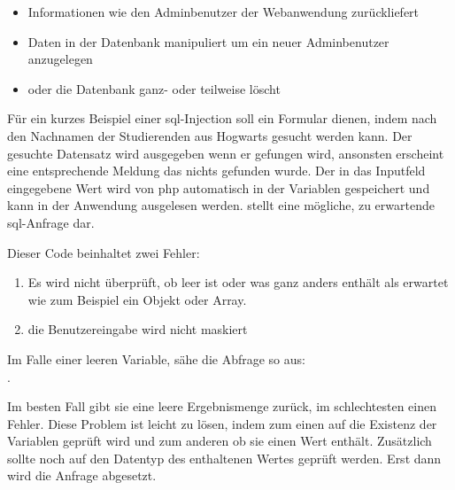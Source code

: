 \begin{itemize}
	\item Informationen wie den Adminbenutzer der Webanwendung zurückliefert
	\item Daten in der Datenbank manipuliert um ein neuer Adminbenutzer anzugelegen
	\item oder die Datenbank ganz- oder teilweise löscht
\end{itemize}

Für ein kurzes Beispiel einer \gls{sql}-Injection soll ein Formular dienen, indem nach den Nachnamen der Studierenden aus Hogwarts gesucht werden kann. Der gesuchte  Datensatz wird ausgegeben wenn er gefungen wird, ansonsten erscheint eine entsprechende Meldung das nichts gefunden wurde. Der in das Inputfeld eingegebene Wert wird von \gls{php} automatisch in der Variablen  gespeichert und kann in der Anwendung ausgelesen werden.  stellt eine mögliche, zu erwartende \gls{sql}-Anfrage dar.

\begin{listing}[H]
\caption{}
\label{lst:sqlInjections}
\end{listing}

Dieser Code beinhaltet zwei Fehler:

\begin{enumerate}
	\item Es wird nicht überprüft, ob  leer ist oder was ganz anders enthält als erwartet wie zum Beispiel ein Objekt oder Array.
	\item die Benutzereingabe wird nicht maskiert
\end{enumerate}

Im Falle einer leeren Variable, sähe die Abfrage so aus:\\ .

Im besten Fall gibt sie eine leere Ergebnismenge zurück, im schlechtesten einen Fehler. Diese Problem ist leicht zu lösen, indem zum einen auf die Existenz der Variablen geprüft wird und zum anderen ob sie einen Wert enthält. Zusätzlich sollte noch auf den Datentyp des enthaltenen Wertes geprüft werden. Erst dann wird die Anfrage abgesetzt.

